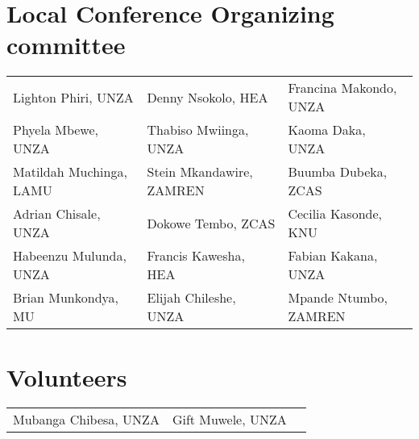\section{Local Conference Organizing committee}
\begin{center}
\begin{tabular}{lll}
Lighton Phiri, UNZA & Denny Nsokolo, HEA & Francina Makondo, UNZA \\
Phyela Mbewe, UNZA & Thabiso Mwiinga, UNZA &  Kaoma Daka, UNZA \\
Matildah Muchinga, LAMU  & Stein Mkandawire, ZAMREN & Buumba Dubeka, ZCAS \\
Adrian Chisale, UNZA & Dokowe Tembo, ZCAS & Cecilia Kasonde, KNU \\
Habeenzu Mulunda, UNZA & Francis Kawesha, HEA & Fabian Kakana, UNZA \\
Brian Munkondya, MU & Elijah Chileshe, UNZA & Mpande Ntumbo, ZAMREN \\
\end{tabular}

\section{Volunteers}
\begin{center}
\begin{tabular}{lll}
Mubanga Chibesa, UNZA & Gift Muwele, UNZA \\

\end{tabular}


\end{center}
\end{center}
